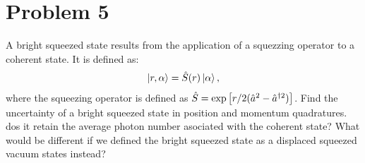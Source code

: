 \documentclass[../main.tex]{subfiles}
\begin{document}
\section*{Problem 5}
A bright squeezed state results from the application of a squezzing operator to a coherent state.
It is defined as:
\begin{gather*}
    \ket{r,\alpha}=\hat{S}(r)\ket{\alpha},
\end{gather*}
where the squeezing operator is defined as $\hat{S}=\exp\qty[r/2(\hat{a}^2 - \hat{a}^{\dagger 2})]$.
Find the uncertainty of a bright squeezed state in position and momentum quadratures.
dos it retain the average photon number asociated with the coherent state?
What would be different if we defined the bright squeezed state as a displaced squeezed vacuum states instead?
\end{document}
